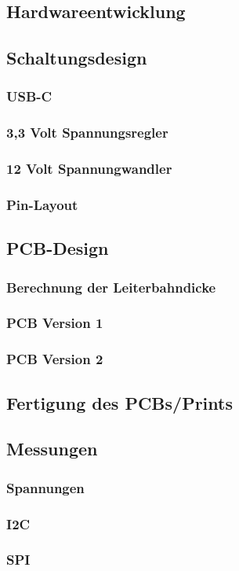 \begin{inhalt}
\renewcommand*\chapterpagestyle{scrheadings}


\chapter{Hardwareentwicklung}

\section{Schaltungsdesign}

      \subsection{USB-C}
      \subsection{3,3 Volt Spannungsregler}
      \subsection{12 Volt Spannungwandler}

   \subsection{Pin-Layout}

\section{PCB-Design}

   \subsection{Berechnung der Leiterbahndicke}
   \subsection{PCB Version 1}
   \label{ref:PCB_Version_1}
   \subsection{PCB Version 2}

\section{Fertigung des PCBs/Prints}

\section{Messungen}
	\subsection{Spannungen}
	\subsection{I2C}
	\subsection{SPI}

\end{inhalt}
